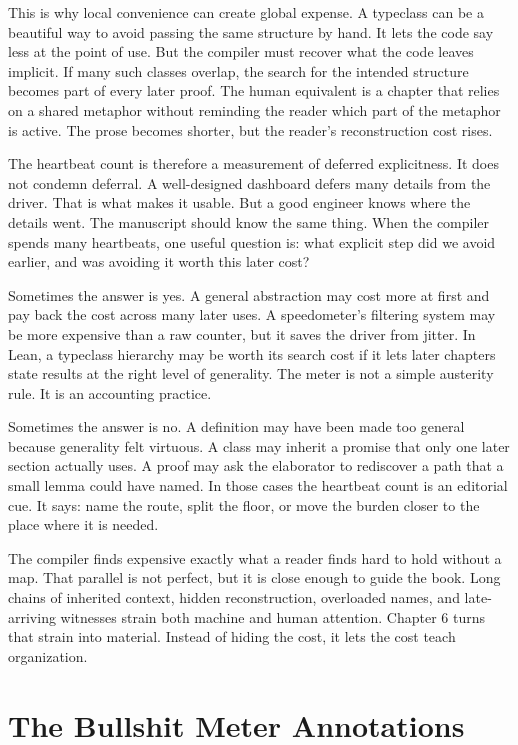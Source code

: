 This is why local convenience can create global expense. A typeclass can be a
beautiful way to avoid passing the same structure by hand. It lets the code say
less at the point of use. But the compiler must recover what the code leaves
implicit. If many such classes overlap, the search for the intended structure
becomes part of every later proof. The human equivalent is a chapter that
relies on a shared metaphor without reminding the reader which part of the
metaphor is active. The prose becomes shorter, but the reader's reconstruction
cost rises.

The heartbeat count is therefore a measurement of deferred explicitness. It
does not condemn deferral. A well-designed dashboard defers many details from
the driver. That is what makes it usable. But a good engineer knows where the
details went. The manuscript should know the same thing. When the compiler
spends many heartbeats, one useful question is: what explicit step did we avoid
earlier, and was avoiding it worth this later cost?

Sometimes the answer is yes. A general abstraction may cost more at first and
pay back the cost across many later uses. A speedometer's filtering system may
be more expensive than a raw counter, but it saves the driver from jitter. In
Lean, a typeclass hierarchy may be worth its search cost if it lets later
chapters state results at the right level of generality. The meter is not a
simple austerity rule. It is an accounting practice.

Sometimes the answer is no. A definition may have been made too general
because generality felt virtuous. A class may inherit a promise that only one
later section actually uses. A proof may ask the elaborator to rediscover a
path that a small lemma could have named. In those cases the heartbeat count is
an editorial cue. It says: name the route, split the floor, or move the burden
closer to the place where it is needed.

The compiler finds expensive exactly what a reader finds hard to hold without a
map. That parallel is not perfect, but it is close enough to guide the book.
Long chains of inherited context, hidden reconstruction, overloaded names, and
late-arriving witnesses strain both machine and human attention. Chapter 6
turns that strain into material. Instead of hiding the cost, it lets the cost
teach organization.

\section{The Bullshit Meter Annotations}
\label{se:bullshit-meter-annotations}

